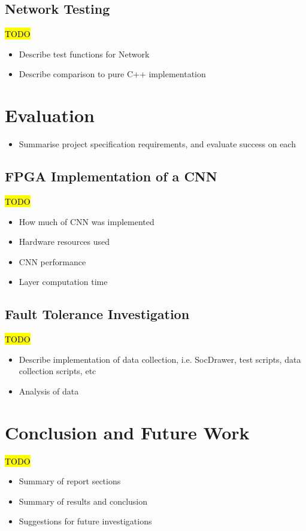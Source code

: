 \documentclass[12pt]{article}
\begin{document}
\subsection{Network Testing}
\label{sec:Test-Network}


\hl{TODO}

\begin{itemize}
\item Describe test functions for Network
\item Describe comparison to pure C++ implementation
\end{itemize}

\newpage

\section{Evaluation}
\label{sec:Eval}


\begin{itemize}
\item Summarise project specification requirements, and evaluate success on each
\end{itemize}

\subsection{FPGA Implementation of a CNN}
\label{sec:Eval-FPGAImplOfCnn}


\hl{TODO}

\begin{itemize}
\item How much of CNN was implemented
\item Hardware resources used
\item CNN performance
\item Layer computation time
\end{itemize}

\subsection{Fault Tolerance Investigation}
\label{sec:Eval-FaultTolInv}


\hl{TODO}

\begin{itemize}
\item Describe implementation of data collection, i.e. SocDrawer, test scripts, data collection scripts, etc
\item Analysis of data
\end{itemize}

\newpage

\section{Conclusion and Future Work}
\label{sec:Conclusion}


\hl{TODO}

\begin{itemize}
\item Summary of report sections
\item Summary of results and conclusion
\item Suggestions for future investigations
\end{itemize}

\newpage



\end{document}

